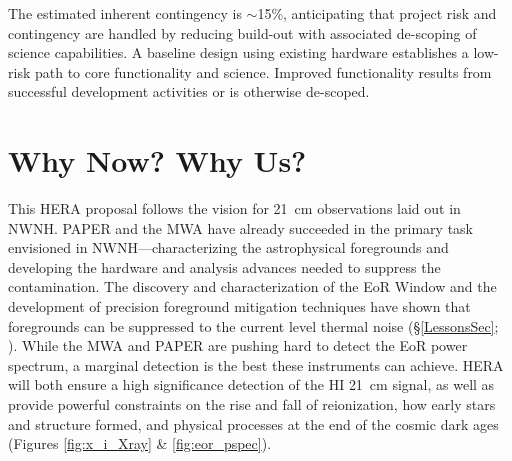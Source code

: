 \documentclass[preprint]{aastex}
\def\HI{{H{\small I }}}
\begin{document}
%

The estimated inherent contingency is $\sim$15\%, anticipating that project 
risk and contingency are handled by reducing
build-out with associated de-scoping of science capabilities.
A baseline design using
existing hardware establishes a low-risk path to core functionality and science.  Improved functionality
results from successful development activities or is otherwise de-scoped.


\section{Why Now? Why Us?} %

This HERA proposal follows the vision for 21~cm observations laid out in NWNH.
PAPER and the MWA have already succeeded in the primary task envisioned in
NWNH---characterizing the astrophysical foregrounds and developing the hardware
and analysis advances needed to suppress the contamination. The discovery and
characterization of the EoR Window and the development of precision foreground
mitigation techniques have shown that foregrounds can be suppressed to the current level
thermal noise (\S \ref{LessonsSec}; \citealt{parsons_et_al2013}). While the MWA
and PAPER are pushing hard to detect the EoR power spectrum, %
a marginal detection is the best these instruments can achieve.
HERA will both ensure a high significance detection of the \HI 21~cm signal, as
well as provide powerful constraints on the rise and fall of reionization, how
early stars and structure formed, and physical processes at the end of the
cosmic dark ages (Figures \ref{fig:x_i_Xray} \& \ref{fig:eor_pspec}).
\end{document}
